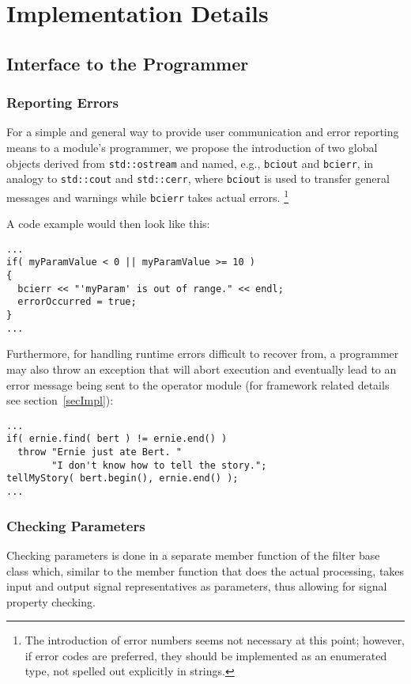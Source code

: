 \documentclass[12pt,a4paper]{article}
\begin{document}
\pagebreak
\section{Implementation Details}

\subsection{Interface to the Programmer}

\subsubsection{Reporting Errors}

For a simple and general way to provide
user communication and error reporting means to a module's
programmer, we propose the introduction of two global
objects derived from \texttt{std::ostream} and named, e.g.,
\texttt{bciout} and \texttt{bcierr}, in analogy to
\texttt{std::cout} and \texttt{std::cerr}, where \texttt{bciout}
is used to transfer general messages and warnings while
\texttt{bcierr} takes actual errors. \footnote{The introduction
of error numbers seems not necessary at this point;
however, if error codes are preferred, they should
be implemented as an enumerated type, not spelled
out explicitly in strings.}

A code example would then look like this:
\begin{verbatim}
...
if( myParamValue < 0 || myParamValue >= 10 )
{
  bcierr << "'myParam' is out of range." << endl;
  errorOccurred = true;
}
...
\end{verbatim}

Furthermore, for handling runtime errors difficult to recover
from, a programmer may also throw an exception that will abort
execution and
eventually lead to an error message being sent to the operator
module (for framework related details see section~\ref{secImpl}):
\begin{verbatim}
...
if( ernie.find( bert ) != ernie.end() )
  throw "Ernie just ate Bert. " 
        "I don't know how to tell the story.";
tellMyStory( bert.begin(), ernie.end() );
...
\end{verbatim}

\subsubsection{Checking Parameters}

Checking parameters is done in a separate member function
of the filter base class which, similar to the member function
that does the actual processing, takes input and output signal
representatives as parameters, thus allowing for signal
property checking.
\end{document}
